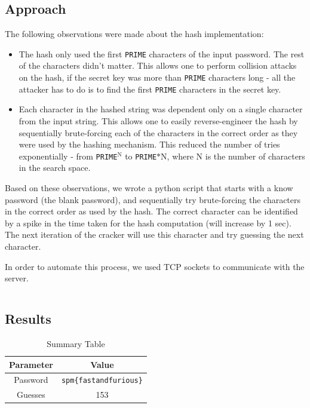 \documentclass[12pt,a4paper,english]{paper}
\newenvironment{colorboxed}[4][gray]{
\begin{tcolorbox}[colback=#1!3!white,colframe=#1(ryb)!50!black,title=\textbf{#2 #3},#4]
}{
\end{tcolorbox}
}
\begin{document}
\subsection{Approach}
The following observations were made about the hash implementation:
\begin{itemize}
    \item The hash only used the first \texttt{PRIME} characters of the input password. The rest of the characters didn't matter. This allows one to perform collision attacks on the hash, if the secret key was more than \texttt{PRIME} characters long - all the attacker has to do is to find the first \texttt{PRIME} characters in the secret key.
    \item Each character in the hashed string was dependent only on a single character from the input string. This allows one to easily reverse-engineer the hash by sequentially brute-forcing each of the characters in the correct order as they were used by the hashing mechanism. This reduced the number of tries exponentially - from \texttt{PRIME}$^\text{N}$ to \texttt{PRIME}$*\text{N}$, where N is the number of characters in the search space.
\end{itemize}

Based on these observations, we wrote a python script that starts with a know password (the blank password), and sequentially try brute-forcing the characters in the correct order as used by the hash. The correct character can be identified by a spike in the time taken for the hash computation (will increase by 1 sec). The next iteration of the cracker will use this character and try guessing the next character.

In order to automate this process, we used TCP sockets to communicate with the server.

\begin{colorboxed}{Password cracker script}{}{breakable}
    \inputminted[baselinestretch=0.85,breaklines,fontsize=\footnotesize]{python}{HashCollision/cracker.py}
\end{colorboxed}
\subsection{Results}

\begin{table}[H]
    \centering
    \begin{tabular}{|c|c|}
        \hline
         \textbf{Parameter}    &        \textbf{Value}                   \\ \hline
                {Password}     & \texttt{spm\{fastandfurious\}}          \\ \hline
                {Guesses}      &            153                          \\ \hline
    \end{tabular}
    \caption{Summary Table}
\end{table}
\end{document}

